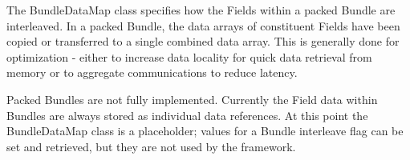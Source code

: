 
The BundleDataMap class specifies how the Fields within a packed Bundle are 
interleaved.  In a packed Bundle, the data arrays of constituent 
Fields have been copied or transferred to a single combined data array.  
This is generally done for optimization - either to increase data 
locality for quick data retrieval from memory or to aggregate 
communications to reduce latency.  

Packed Bundles are not fully implemented.  Currently the Field data 
within Bundles are always stored as individual data references.  
At this point the BundleDataMap class is a placeholder; values for 
a Bundle interleave flag can be set and retrieved, but they are not used 
by the framework. 